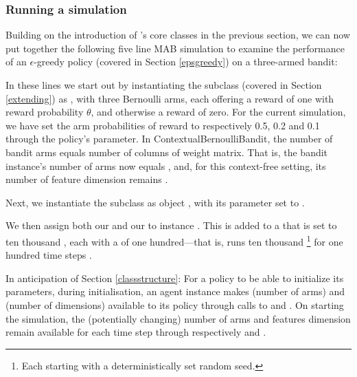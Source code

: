 \documentclass{jss}
\begin{document}
\subsubsection{Running a simulation}

Building on the introduction of 's core classes in the previous section, we can now put together the following five line MAB simulation to examine the performance of an $\epsilon$-greedy policy (covered in Section \ref{epsgreedy}) on a three-armed bandit:

\begin{CodeChunk}
\end{CodeChunk}

In these lines we start out by instantiating the  subclass  (covered in Section \ref{extending}) as , with three Bernoulli arms, each offering a reward of one with reward probability $\theta$, and otherwise a reward of zero. For the current simulation, we have set the  arm probabilities of reward to respectively 0.5, 0.2 and 0.1 through the policy's  parameter. In ContextualBernoulliBandit, the number of bandit arms equals number of columns of weight matrix. That is, the bandit instance's number of arms  now equals , and, for this context-free setting, its number of feature dimension  remains .

Next, we instantiate the  subclass  as object , with its  parameter set to .

We then assign both our  and our  to  instance . This  is added to a  that is set to ten thousand , each with a  of one hundred---that is,  runs ten thousand \footnote{Each starting with a deterministically set random seed.} for one hundred time steps .

In anticipation of Section \ref{classstructure}: For a policy to be able to initialize its parameters, during initialisation, an agent instance makes  (number of arms) and  (number of dimensions) available to its policy through calls to  and . On starting the simulation, the (potentially changing) number of arms and features dimension remain available for each time step  through respectively  and .
\end{document}
